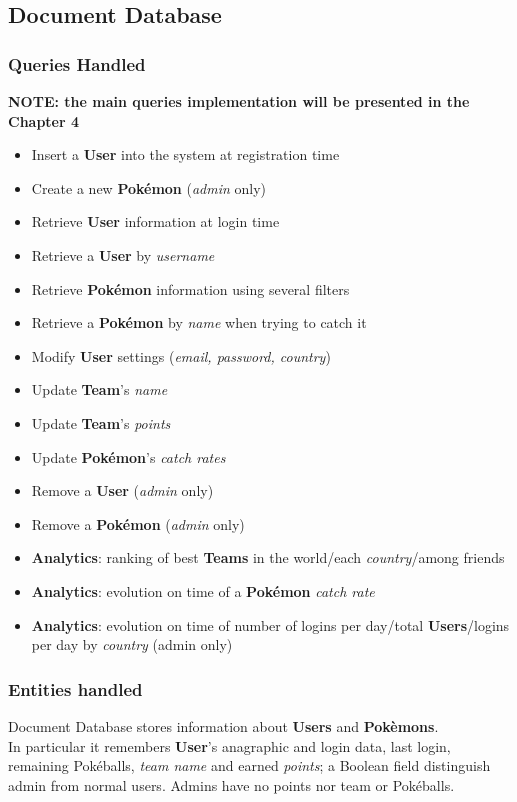 \subsection{Document Database}
\subsubsection{Queries Handled}
\textbf{NOTE: the main queries implementation will be presented in the Chapter 4}
\begin{itemize}
	\item Insert a \textbf{User} into the system at registration time
	\item Create a new \textbf{Pokémon} (\textit{admin} only)
	\item Retrieve \textbf{User} information at login time
	\item Retrieve a \textbf{User} by \textit{username}
	\item Retrieve \textbf{Pokémon} information using several filters
	\item Retrieve a \textbf{Pokémon} by \textit{name} when trying to catch it
	\item Modify \textbf{User} settings (\textit{email, password, country})
	\item Update \textbf{Team}’s \textit{name}
	\item Update \textbf{Team}’s \textit{points}
	\item Update \textbf{Pokémon}’s \textit{catch rates} 
	\item Remove a \textbf{User} (\textit{admin} only)
	\item Remove a \textbf{Pokémon} (\textit{admin} only)
	\item \textbf{Analytics}: ranking of best \textbf{Teams} in the world/each \textit{country}/among friends
	\item \textbf{Analytics}: evolution on time of a \textbf{Pokémon} \textit{catch rate}
	\item \textbf{Analytics}: evolution on time of number of logins per day/total \textbf{Users}/logins per day by \textit{country} (admin only)
\end{itemize}
\subsubsection{Entities handled}
Document Database stores information about \textbf{Users} and \textbf{Pokèmons}. \medspace \\ 

In particular it remembers \textbf{User}’s anagraphic and login data, last login, remaining Pokéballs, \textit{team name} and earned \textit{points}; a Boolean field distinguish admin from normal users. Admins have no points nor team or Pokéballs.\\


